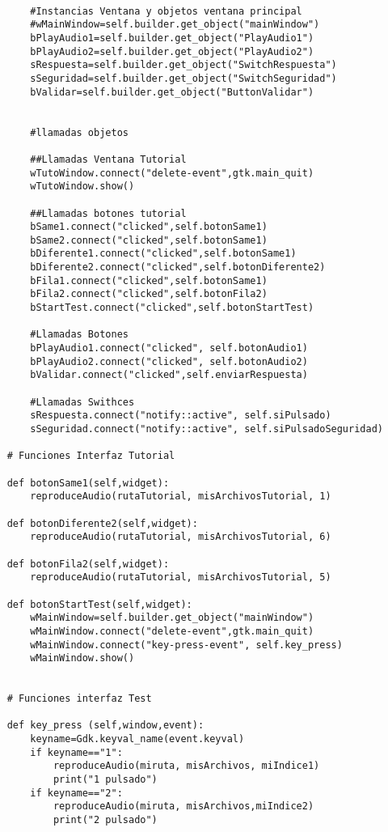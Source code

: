 \documentclass[11pt,a4paper,twoside]{book}
\begin{document}
\begin{verbatim}
        
        #Instancias Ventana y objetos ventana principal
        #wMainWindow=self.builder.get_object("mainWindow")
        bPlayAudio1=self.builder.get_object("PlayAudio1")
        bPlayAudio2=self.builder.get_object("PlayAudio2")
        sRespuesta=self.builder.get_object("SwitchRespuesta")
        sSeguridad=self.builder.get_object("SwitchSeguridad")
        bValidar=self.builder.get_object("ButtonValidar")


        #llamadas objetos
        
        ##Llamadas Ventana Tutorial
        wTutoWindow.connect("delete-event",gtk.main_quit)
        wTutoWindow.show()
        
        ##Llamadas botones tutorial
        bSame1.connect("clicked",self.botonSame1)
        bSame2.connect("clicked",self.botonSame1)
        bDiferente1.connect("clicked",self.botonSame1)
        bDiferente2.connect("clicked",self.botonDiferente2)
        bFila1.connect("clicked",self.botonSame1)
        bFila2.connect("clicked",self.botonFila2)
        bStartTest.connect("clicked",self.botonStartTest)

        #Llamadas Botones
        bPlayAudio1.connect("clicked", self.botonAudio1)
        bPlayAudio2.connect("clicked", self.botonAudio2)
        bValidar.connect("clicked",self.enviarRespuesta)

        #Llamadas Swithces
        sRespuesta.connect("notify::active", self.siPulsado)
        sSeguridad.connect("notify::active", self.siPulsadoSeguridad)
        
    # Funciones Interfaz Tutorial
    
    def botonSame1(self,widget):
        reproduceAudio(rutaTutorial, misArchivosTutorial, 1)
        
    def botonDiferente2(self,widget):
        reproduceAudio(rutaTutorial, misArchivosTutorial, 6)
        
    def botonFila2(self,widget):
        reproduceAudio(rutaTutorial, misArchivosTutorial, 5)
        
    def botonStartTest(self,widget):
        wMainWindow=self.builder.get_object("mainWindow")
        wMainWindow.connect("delete-event",gtk.main_quit)
        wMainWindow.connect("key-press-event", self.key_press)
        wMainWindow.show()
        
         
    # Funciones interfaz Test

    def key_press (self,window,event):
        keyname=Gdk.keyval_name(event.keyval)
        if keyname=="1":
            reproduceAudio(miruta, misArchivos, miIndice1)
            print("1 pulsado")
        if keyname=="2":
            reproduceAudio(miruta, misArchivos,miIndice2)
            print("2 pulsado")
            

\end{verbatim}
\end{document}
